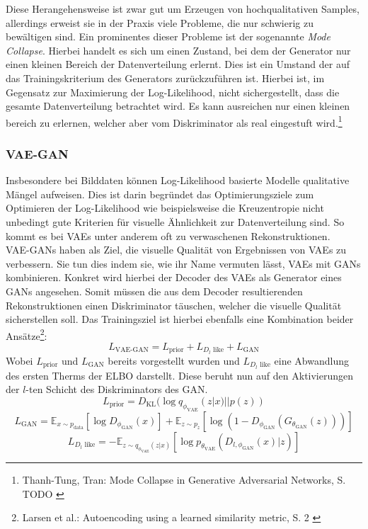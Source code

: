 Diese Herangehensweise ist zwar gut um Erzeugen von hochqualitativen Samples, allerdings erweist sie in der Praxis viele Probleme, die nur schwierig zu bewältigen sind. Ein prominentes dieser Probleme ist der sogenannte \textit{Mode Collapse}. Hierbei handelt es sich um einen Zustand, bei dem der Generator nur einen kleinen Bereich der Datenverteilung erlernt. Dies ist ein Umstand der auf das Trainingskriterium des Generators zurückzuführen ist. Hierbei ist, im Gegensatz zur Maximierung der Log-Likelihood, nicht sichergestellt, dass die gesamte Datenverteilung betrachtet wird. Es kann ausreichen nur einen kleinen bereich zu erlernen, welcher aber vom Diskriminator als real eingestuft wird.\footnote{
    Thanh-Tung, Tran: Mode Collapse in Generative Adversarial Networks, S. TODO
    \cite{thanhtung2020catastrophicforgettingmodecollapse}
}

\subsubsection{VAE-GAN}

Insbesondere bei Bilddaten können Log-Likelihood basierte Modelle qualitative Mängel aufweisen. Dies ist darin begründet das Optimierungsziele zum Optimieren der Log-Likelihood wie beispielsweise die Kreuzentropie nicht unbedingt gute Kriterien für visuelle Ähnlichkeit zur Datenverteilung sind. So kommt es bei VAEs unter anderem oft zu verwaschenen Rekonstruktionen. \\
VAE-GANs haben als Ziel, die visuelle Qualität von Ergebnissen von VAEs zu verbessern. Sie tun dies indem sie, wie ihr Name vermuten lässt, VAEs mit GANs kombinieren. Konkret wird hierbei der Decoder des VAEs als Generator eines GANs angesehen. Somit müssen die aus dem Decoder resultierenden Rekonstruktionen einen Diskriminator täuschen, welcher die visuelle Qualität sicherstellen soll. Das Trainingsziel ist hierbei ebenfalls eine Kombination beider Ansätze\footnote{
    Larsen et al.: Autoencoding using a learned similarity metric, S. 2
    \cite{larsen2016autoencoding}
}:
\begin{equation}
    L_\text{VAE-GAN}
    =  L_\text{prior} +  L_{D_l\text{ like}} +  L_\text{GAN}
\end{equation}
Wobei $ L_\text{prior}$ und $ L_\text{GAN}$ bereits vorgestellt wurden und $ L_{D_l\text{ like}}$ eine Abwandlung des ersten Therms der ELBO darstellt. Diese beruht nun auf den Aktivierungen der $l$-ten Schicht des Diskriminators des GAN. 
\begin{equation}
    L_\text{prior} 
    = D_\text{KL} (\log q_{\phi_\text{VAE}}(z|x) || p(z))
\end{equation}
\begin{equation}
    L_\text{GAN} = \mathbb E_{x \sim p_\text{data}}[\log D_{\phi_\text{GAN}}(x)] 
    + \mathbb E_{z \sim p_z}
    [\log (1 - D_{\phi_\text{GAN}}(G_{\theta_\text{GAN}}(z)))]
\end{equation}
\begin{equation}
    L_{D_l\text{ like}} = 
    - \mathbb E_{z \sim q_{\phi_\text{VAE}}(z|x)}
    \left [
        \log p_{\theta_\text{VAE}}(D_{l, \phi_\text{GAN}}(x)|z)
    \right ]
\end{equation}

